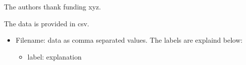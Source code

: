 \documentclass[journal=jctcce,manuscript=article, layout=twocolumn]{achemso}
\begin{document}
\begin{acknowledgement}
The authors thank funding xyz.
\end{acknowledgement}

\begin{suppinfo}
The data is provided in csv.
\begin{itemize}
  \item Filename: data as comma separated values. The labels are explaind below:
  \begin{itemize}
   \item label: explanation
  \end{itemize}


\end{itemize}

\end{suppinfo}


\end{document}
